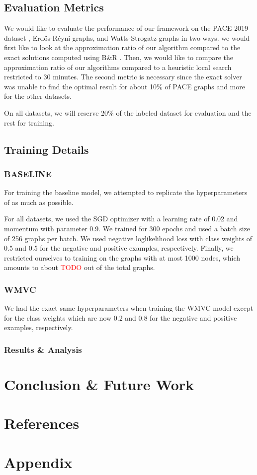 \documentclass{article}
\begin{document}
\subsection{Evaluation Metrics}
We would like to evaluate the performance of our framework on the PACE 2019 dataset \citet{pace2019},
Erd\H os-R\'eyni graphs,
and Watts-Strogatz graphs in two ways.
we would first like to look at the approximation ratio of our algorithm compared to the exact solutions
computed using B\&R \citet{kamis}.
Then, we would like to compare the approximation ratio of our algorithms compared to a heuristic local search
restricted to 30 minutes.
The second metric is necessary since the exact solver was unable to find the optimal result for about 10\% of PACE graphs
and more for the other datasets.

On all datasets,
we will reserve 20\% of the labeled dataset for evaluation
and the rest for training.

\subsection{Training Details}
\subsubsection{BASELINE}
For training the baseline model,
we attempted to replicate the hyperparameters of \citet{langedal_et_al}
as much as possible.

For all datasets,
we used the SGD optimizer with a learning rate of 0.02 and momentum with parameter 0.9.
We trained for 300 epochs
and used a batch size of 256 graphs per batch.
We used negative loglikelihood loss
with class weights of 0.5 and 0.5 for the negative and positive examples,
respectively.
Finally,
we restricted ourselves to training on the graphs with at most 1000 nodes,
which amounts to about \textcolor{red}{TODO} out of the total graphs.

\subsubsection{WMVC}
We had the exact same hyperparameters
when training the WMVC model
except for the class weights which are now 0.2 and 0.8
for the negative and positive examples,
respectively.

\subsubsection{Results \& Analysis}

\section{Conclusion \& Future Work}
\label{sec:conclusion}

\section{References}



\section{Appendix}
\end{document}
